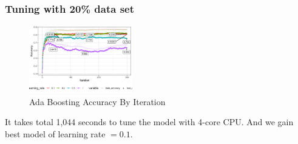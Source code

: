 \documentclass[conference]{IEEEtran}
\begin{document}
\subsubsection{Tuning with 20\% data set}
\begin{figure}[htbp]
\centerline{\includegraphics[width=0.4\textwidth]{figure/Ada Boosting Accuracy By Iteration.png}}
\caption{Ada Boosting Accuracy By Iteration}
\label{Ada Boosting Accuracy By Iteration}
\end{figure}
It takes total 1,044 seconds to tune the model with 4-core CPU. And we gain best model of learning rate $=0.1$.
\end{document}
